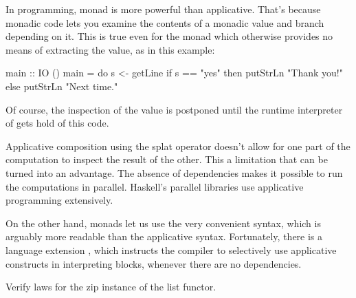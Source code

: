 \documentclass[DaoFP]{subfiles}
\begin{document}
In programming, monad is more powerful than applicative. That's because monadic code lets you examine the contents of a monadic value and branch depending on it. This is true even for the  monad which otherwise provides no means of extracting the value, as in this example:
\begin{haskell}
main :: IO ()
main = do
  s <- getLine
  if s == "yes"
  then putStrLn "Thank you!"
  else putStrLn "Next time."
\end{haskell}
Of course, the inspection of the value is postponed until the runtime interpreter of  gets hold of this code. 

Applicative composition using the splat operator doesn't allow for one part of the computation to inspect the result of the other. This a limitation that can be turned into an advantage. The absence of dependencies makes it possible to run the computations in parallel.  Haskell's parallel libraries use applicative programming extensively.

On the other hand, monads let us use the very convenient  syntax, which is arguably more readable than the applicative syntax. Fortunately, there is a language extension , which instructs the compiler to selectively use applicative constructs in interpreting  blocks, whenever there are no dependencies.

\begin{exercise}
Verify  laws for the zip instance of the list functor.
\end{exercise}
\end{document}

